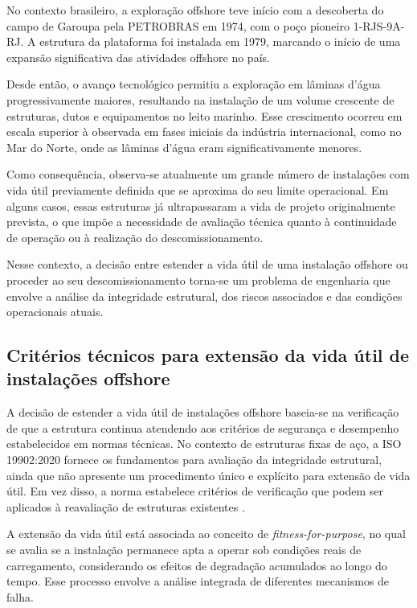 \documentclass[a4paper,12pt]{article}
\begin{document}
No contexto brasileiro, a exploração offshore teve início com a descoberta do campo de Garoupa pela PETROBRAS em 1974, com o poço pioneiro 1-RJS-9A-RJ. A estrutura da plataforma foi instalada em 1979, marcando o início de uma expansão significativa das atividades offshore no país.

Desde então, o avanço tecnológico permitiu a exploração em lâminas d’água progressivamente maiores, resultando na instalação de um volume crescente de estruturas, dutos e equipamentos no leito marinho. Esse crescimento ocorreu em escala superior à observada em fases iniciais da indústria internacional, como no Mar do Norte, onde as lâminas d’água eram significativamente menores.

Como consequência, observa-se atualmente um grande número de instalações com vida útil previamente definida que se aproxima do seu limite operacional. Em alguns casos, essas estruturas já ultrapassaram a vida de projeto originalmente prevista, o que impõe a necessidade de avaliação técnica quanto à continuidade de operação ou à realização do descomissionamento.

Nesse contexto, a decisão entre estender a vida útil de uma instalação offshore ou proceder ao seu descomissionamento torna-se um problema de engenharia que envolve a análise da integridade estrutural, dos riscos associados e das condições operacionais atuais.

\subsection{Critérios técnicos para extensão da vida útil de instalações offshore}

A decisão de estender a vida útil de instalações offshore baseia-se na verificação de que a estrutura continua atendendo aos critérios de segurança e desempenho estabelecidos em normas técnicas. No contexto de estruturas fixas de aço, a ISO 19902:2020 fornece os fundamentos para avaliação da integridade estrutural, ainda que não apresente um procedimento único e explícito para extensão de vida útil. Em vez disso, a norma estabelece critérios de verificação que podem ser aplicados à reavaliação de estruturas existentes \cite{ISO19902_2020}.

A extensão da vida útil está associada ao conceito de \textit{fitness-for-purpose}, no qual se avalia se a instalação permanece apta a operar sob condições reais de carregamento, considerando os efeitos de degradação acumulados ao longo do tempo. Esse processo envolve a análise integrada de diferentes mecanismos de falha.
\end{document}
